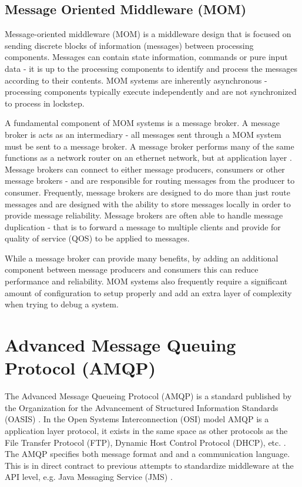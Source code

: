 \documentclass{thesis}
\begin{document}
\subsection{Message Oriented Middleware (MOM)}
Message-oriented middleware (MOM) is a middleware design that is focused on sending discrete blocks of information (messages) between processing components.  Messages can contain state information, commands or pure input data - it is up to the processing components to identify and process the messages according to their contents.  MOM systems are inherently asynchronous - processing components typically execute independently and are not synchronized to process in lockstep.

A fundamental component of MOM systems is a message broker.  A message broker is acts as an intermediary - all messages sent through a MOM system must be sent to a message broker.  A message broker performs many of the same functions as a network router on an ethernet network, but at application layer \cite{WIKI_OSI}.  Message brokers can connect to either message producers, consumers or other message brokers - and are responsible for routing messages from the producer to consumer.  Frequently, message brokers are designed to do more than just route messages and are designed with the ability to store messages locally in order to provide message reliability.  Message brokers are often able to handle message duplication - that is to forward a message to multiple clients and provide for quality of service (QOS) to be applied to messages.  

While a message broker can provide many benefits, by adding an additional component between message producers and consumers this can reduce performance and reliability.  MOM systems also frequently require a significant amount of configuration to setup properly and add an extra layer of complexity when trying to debug a system.
 

\section{Advanced Message Queuing Protocol (AMQP)}
The Advanced Message Queueing Protocol (AMQP) is a standard published by the Organization for the Advancement of Structured Information Standards (OASIS) \cite{OASIS}.  In the Open Systems Interconnection (OSI) model AMQP is a application layer protocol, it exists in the same space as other protocols as the File Transfer Protocol (FTP), Dynamic Host Control Protocol (DHCP), etc.  \cite{WIKI_OSI}.  The AMQP specifies both message format and and a communication language.  This is in direct contract to previous attempts to standardize middleware at the API level, e.g. Java Messaging Service (JMS) \cite{ORACLE_JMS}.
\end{document}
